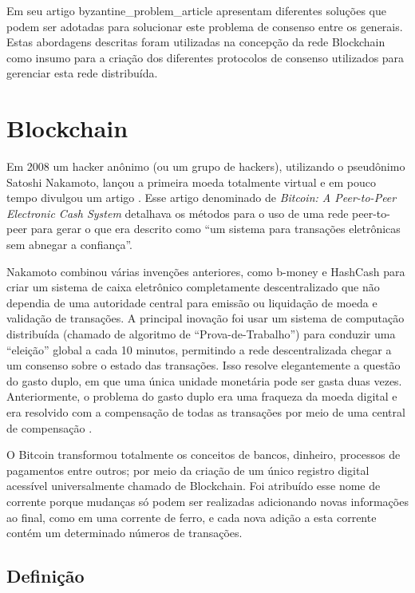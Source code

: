             Em seu artigo \citeauthor{}{byzantine_problem_article} apresentam diferentes soluções que podem ser adotadas para solucionar este problema de consenso entre os generais. Estas abordagens descritas foram utilizadas na concepção da rede Blockchain como insumo para a criação dos diferentes protocolos de consenso utilizados para gerenciar esta rede distribuída.   
    
    
   
\section{Blockchain}

    
    Em 2008 um hacker anônimo (ou um grupo de hackers), utilizando o pseudônimo Satoshi Nakamoto, lançou a primeira moeda totalmente virtual e em pouco tempo divulgou um artigo \cite{bitcoin_satoshi}. Esse artigo denominado de \textit{Bitcoin: A Peer-to-Peer Electronic Cash System} detalhava os métodos para o uso de uma rede peer-to-peer para gerar o que era descrito como “um sistema para transações eletrônicas sem abnegar a confiança”.
    
    Nakamoto combinou várias invenções anteriores, como b-money e HashCash para criar um sistema de caixa eletrônico completamente descentralizado que não dependia de uma autoridade central para emissão ou liquidação de moeda e validação de transações. A principal inovação foi usar um sistema de computação distribuída (chamado de algoritmo de “Prova-de-Trabalho”) para conduzir uma “eleição” global a cada 10 minutos, permitindo a rede descentralizada chegar a um consenso sobre o estado das transações. Isso resolve elegantemente a questão do gasto duplo, em que uma única unidade monetária pode ser gasta duas vezes. Anteriormente, o problema do gasto duplo era uma fraqueza da moeda digital e era resolvido com a compensação de todas as transações por meio de uma central de compensação \cite{mastering_blockchain_andreas}.
    
    O Bitcoin transformou totalmente os conceitos de bancos, dinheiro, processos de pagamentos entre outros; por meio da criação de um único registro digital acessível universalmente chamado de Blockchain. Foi atribuído esse nome de corrente porque mudanças só podem ser realizadas adicionando novas informações ao final, como em uma corrente de ferro, e cada nova adição a esta corrente contém um determinado números de transações.



    \subsection{Definição}
    
